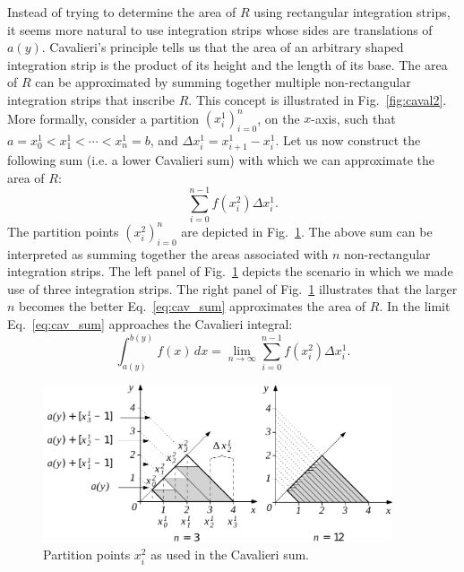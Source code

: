 \documentclass{article}
\theoremstyle{theorem}
\theoremstyle{definition}
\begin{document}
\noindent
Instead of trying to determine the area of $R$ using rectangular integration strips, it seems more natural 
to use integration strips whose sides are translations of $a(y)$. Cavalieri's principle tells us that the area of an 
arbitrary shaped integration strip is the product of its height and the length of its base. The area of $R$ 
can be approximated by summing together multiple non-rectangular integration strips that inscribe $R$. This concept is illustrated in Fig.~\eqref{fig:caval2}. 
More formally, consider a partition $(x_i^1)_{i=0}^{n}$, on the $x$-axis, such that $a = x_0^1 < x_1^1 < \cdots < x_n^1 = b$, and $\Delta x_i^1 = x_{i+1}^1 - x_i^1$.
Let us now construct the following sum (i.e. a lower Cavalieri sum) with which we can approximate the area 
of $R$:
\begin{equation}
\label{eq:cav_sum}
\sum_{i=0}^{n-1} f(x_i^2)\Delta x_i^1.
\end{equation}
The partition points $(x_i^2)_{i=0}^{n}$ are depicted in Fig.~\ref{fig:caval2}.
The above sum can be interpreted as summing together the areas associated with $n$ non-rectangular integration strips.
The left panel of Fig.~\ref{fig:caval2} depicts the scenario in which we made use of three integration strips.  
The right panel of Fig.~\ref{fig:caval2} illustrates that the larger $n$ becomes the better Eq.~\eqref{eq:cav_sum} approximates the area of $R$. In the limit Eq.~\eqref{eq:cav_sum} approaches the Cavalieri integral:
\begin{equation}
\label{eq:caval1}
\int_{a(y)}^{b(y)}f(x)\, dx = \lim_{n\to \infty}\sum_{i=0}^{n-1} f(x_i^2)\Delta x_i^1.
\end{equation}

\begin{figure}[htb]
\centering
\includegraphics[width=0.92\textwidth]{fig13}
\caption{Partition points $x_i^2$ as used in the Cavalieri sum.}
\label{fig:caval2}
\end{figure}
\end{document}
